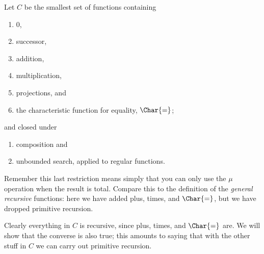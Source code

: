 \documentclass[../../include/open-logic-section]{subfiles}
\begin{document}

Let $C$ be the smallest set of functions containing
\begin{enumerate}
\item $0$,
\item successor,
\item addition,
\item multiplication,
\item projections, and 
\item the characteristic function for equality, $\Char{=}$;
\end{enumerate}
and closed under
\begin{enumerate}
\item composition and
\item unbounded search, applied to regular
functions. 
\end{enumerate}
Remember this last restriction means simply that you can only use the
$\mu$ operation when the result is total. Compare this to the
definition of the \emph{general recursive} functions: here we have
added plus, times, and $\Char{=}$, but we have dropped primitive
recursion.  

Clearly everything in $C$ is recursive, since plus, times,
and $\Char{=}$ are. We will show that the converse is also true; this
amounts to saying that with the other stuff in $C$ we can carry out
primitive recursion.
\end{document}
